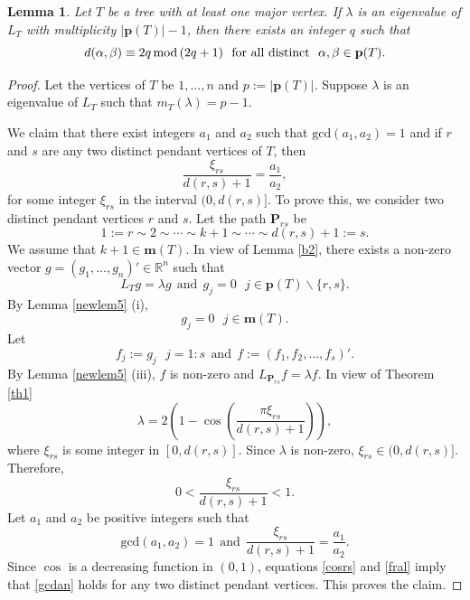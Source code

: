 \documentclass[preprint,12pt]{elsarticle}
\newcommand{\rr}{\mathbb{R}}
\newcommand{\1}{\mathbf{1}}
\newcommand{\0}{\mathbf{0}}
\newcommand{\p}{{\mathbf{P}}}
\def\m{\mathbf{m}}
\def\pt{\mathbf{p}}
\def\p{\mathbf{P}}
\newtheorem{lemma}{Lemma}
\begin{document}
\begin{lemma} \label{necessary}
 Let $T$ be a tree with at least one major vertex. 
 If $\lambda$ is an eigenvalue of $L_T$ with multiplicity 
 $|\pt(T)|-1$,
 then there exists an integer $q$ such that
 $$d(\alpha,\beta) \equiv 2q\,{\rm{mod}}\,(2q+1)~~\text{for all distinct}~~\alpha, \beta \in \pt(T).$$    
\end{lemma}
\begin{proof}
Let the vertices of $T$ be $1,\dotsc,n$ and $p:=|\pt(T)|$. 
Suppose $\lambda$ is an eigenvalue of $L_T$ such that $m_T(\lambda)=p-1$. 

We claim that there exist integers $a_1$ and $a_2$ such that $\mbox{gcd}(a_1,a_2)=1$ and
if $r$ and $s$ are any two distinct pendant vertices of $T$, then \[\frac{\xi_{rs}}{d(r,s)+1}=\frac{a_1}{a_2},\] 
for some integer $\xi_{rs}$ in the interval $(0,d(r,s)]$. 
    To prove this, we consider two distinct pendant vertices $r$ and $s$. 
Let the path $\p_{rs}$ be  \[1:=r \sim 2 \sim \cdots \sim k+1 \sim \cdots \sim d(r,s)+1:=s.\]
    We assume that $k+1 \in \m(T)$. In view of Lemma \ref{b2}, there exists a non-zero vector $g=(g_1,\dotsc,g_n)' \in \rr^n$ such that 
    \[L_Tg=\lambda g~~\mbox{and}~~g_{j}=0 ~~~ j \in \pt(T)\smallsetminus \{r,s\}.\] 
    By Lemma \ref{newlem5} (i),
    \begin{equation} \label{gjm}
    g_j=0~~~j \in \m(T).
    \end{equation}
    Let \[f_j:=g_j~~~ j=1:s~~\mbox{and}~~
    f:=(f_{1}, f_{2},\dotsc,f_s)'.\]
By Lemma \ref{newlem5} (iii), $f$ is non-zero and
$L_{\p_{rs}}f=\lambda f$. 
In view of Theorem \ref{th1}
\begin{equation}\label{cosrs}
  \lambda=2\left(1-\cos\left( \frac{\pi \xi_{rs}}{d(r,s)+1}\right)\right),
\end{equation}
where $\xi_{rs}$ is some integer in $[0,d(r,s)]$. Since $\lambda$ is non-zero, $\xi_{rs} \in (0,d(r,s)]$. 
Therefore,
\begin{equation}\label{fral}
0<\frac{\xi_{rs}}{d(r,s)+1} < 1.    
\end{equation}
Let $a_1$ and $a_2$ be positive integers such that
 \begin{equation} \label{gcdan}
\mbox{gcd}(a_1,a_2)=1~~\mbox{and}~~\frac{\xi_{rs}}{d(r,s)+1}=\frac{a_1}{a_2}.
\end{equation}
Since $\cos$ is a decreasing function in $(0,1)$, equations \eqref{cosrs} and \eqref{fral} imply that
\eqref{gcdan}
holds for any two distinct pendant vertices. 
This proves the claim.


\end{proof}
\end{document}
